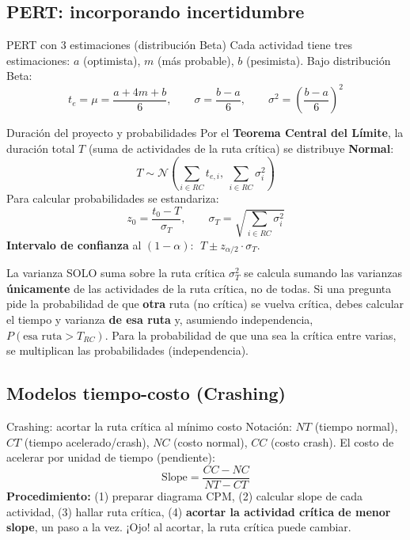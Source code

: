 \subsection{PERT: incorporando incertidumbre}

\begin{formulas}{PERT con 3 estimaciones (distribución Beta)}
Cada actividad tiene tres estimaciones: $a$ (optimista), $m$ (más probable), $b$ (pesimista). Bajo distribución Beta:
\[
  t_e = \mu = \frac{a + 4m + b}{6}, \qquad
  \sigma = \frac{b - a}{6}, \qquad
  \sigma^2 = \left(\frac{b-a}{6}\right)^2
\]
\end{formulas}

\begin{formulas}{Duración del proyecto y probabilidades}
Por el \textbf{Teorema Central del Límite}, la duración total $T$ (suma de actividades de la ruta crítica) se distribuye \textbf{Normal}:
\[
  T \sim \mathcal{N}\!\left(\textstyle\sum_{i\in RC} t_{e,i},\ \sum_{i\in RC} \sigma_i^2\right)
\]
Para calcular probabilidades se estandariza:
\[
  z_0 = \frac{t_0 - T}{\sigma_T}, \qquad \sigma_T = \sqrt{\textstyle\sum_{i\in RC}\sigma_i^2}
\]
\textbf{Intervalo de confianza} al $(1-\alpha)$: $\;T \pm z_{\alpha/2}\cdot\sigma_T$.
\end{formulas}

\begin{trampa}{La varianza SOLO suma sobre la ruta crítica}
$\sigma_T^2$ se calcula sumando las varianzas \textbf{únicamente} de las actividades de la ruta crítica, no de todas. Si una pregunta pide la probabilidad de que \textbf{otra} ruta (no crítica) se vuelva crítica, debes calcular el tiempo y varianza \textbf{de esa ruta} y, asumiendo independencia, $P(\text{esa ruta} > T_{RC})$. Para la probabilidad de que una sea la crítica entre varias, se multiplican las probabilidades (independencia).
\end{trampa}

\subsection{Modelos tiempo-costo (Crashing)}

\begin{formulas}{Crashing: acortar la ruta crítica al mínimo costo}
Notación: $NT$ (tiempo normal), $CT$ (tiempo acelerado/crash), $NC$ (costo normal), $CC$ (costo crash). El costo de acelerar por unidad de tiempo (pendiente):
\[
  \text{Slope} = \frac{CC - NC}{NT - CT}
\]
\textbf{Procedimiento:} (1) preparar diagrama CPM, (2) calcular slope de cada actividad, (3) hallar ruta crítica, (4) \textbf{acortar la actividad crítica de menor slope}, un paso a la vez. ¡Ojo! al acortar, la ruta crítica puede cambiar.
\end{formulas}


